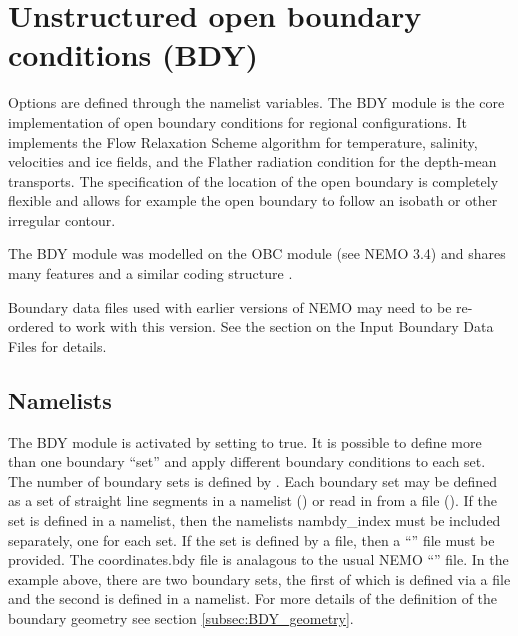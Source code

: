 \documentclass[../main/NEMO_manual]{subfiles}
\begin{document}
\section{Unstructured open boundary conditions (BDY)}
\label{sec:LBC_bdy}




Options are defined through the   namelist variables.
The BDY module is the core implementation of open boundary conditions for regional configurations.
It implements the Flow Relaxation Scheme algorithm for temperature, salinity, velocities and ice fields, and
the Flather radiation condition for the depth-mean transports.
The specification of the location of the open boundary is completely flexible and
allows for example the open boundary to follow an isobath or other irregular contour. 

The BDY module was modelled on the OBC module (see NEMO 3.4) and shares many features and
a similar coding structure \citep{Chanut2005}.

Boundary data files used with earlier versions of NEMO may need to be re-ordered to work with this version.
See the section on the Input Boundary Data Files for details.

\subsection{Namelists}
\label{subsec:BDY_namelist}

The BDY module is activated by setting  to true.
It is possible to define more than one boundary ``set'' and apply different boundary conditions to each set.
The number of boundary sets is defined by .
Each boundary set may be defined as a set of straight line segments in a namelist
() or read in from a file ().
If the set is defined in a namelist, then the namelists nambdy\_index must be included separately, one for each set.
If the set is defined by a file, then a ``'' file must be provided.
The coordinates.bdy file is analagous to the usual NEMO ``'' file.
In the example above, there are two boundary sets, the first of which is defined via a file and
the second is defined in a namelist.
For more details of the definition of the boundary geometry see section \autoref{subsec:BDY_geometry}.
\end{document}
